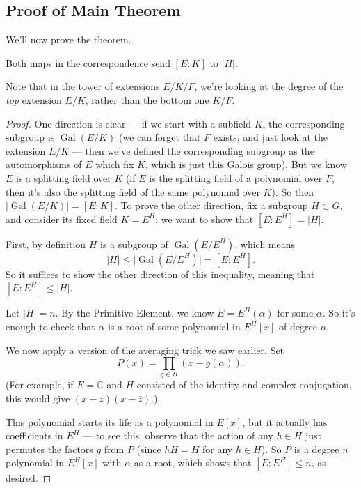 \subsection{Proof of Main Theorem}

We'll now prove the theorem. 

\begin{lemma}
Both maps in the correspondence send $[E : K]$ to $\lvert H \rvert$. 
\end{lemma}

Note that in the tower of extensions $E/K/F$, we're looking at the degree of the \emph{top} extension $E/K$, rather than the bottom one $K/F$.

\begin{proof}
One direction is clear --- if we start with a subfield $K$, the corresponding subgroup is $\operatorname{Gal}(E/K)$ (we can forget that $F$ exists, and just look at the extension $E/K$ --- then we've defined the corresponding subgroup as the automorphisms of $E$ which fix $K$, which is just this Galois group). But we know $E$ is a splitting field over $K$ (if $E$ is the splitting field of a polynomial over $F$, then it's also the splitting field of the same polynomial over $K$). So then $\lvert \operatorname{Gal}(E/K)\rvert = [E : K]$. 
To prove the other direction, fix a subgroup $H \subset G$, and consider its fixed field $K = E^H$; we want to show that $[E : E^H] = \lvert H \rvert$. 

First, by definition $H$ is a subgroup of $\operatorname{Gal}(E/E^H)$, which means \[\lvert H \rvert \leq \lvert \operatorname{Gal}(E/E^H)\rvert = [E : E^H].\] So it suffices to show the other direction of this inequality, meaning that $[E : E^H] \leq \lvert H \rvert$. 

Let $\lvert H \rvert = n$. By the Primitive Element, we know $E = E^H(\alpha)$ for some $\alpha$. So it's enough to check that $\alpha$ is a root of some polynomial in $E^H[x]$ of degree $n$. 

We now apply a version of the averaging trick we saw earlier. Set \[P(x) = \prod_{g \in H} (x - g(\alpha)).\] (For example, if $E = \mathbb{C}$ and $H$ consisted of the identity and complex conjugation, this would give $(x - z)(x - \overline{z})$.) 

This polynomial starts its life as a polynomial in $E[x]$, but it actually has coefficients in $E^H$ --- to see this, observe that the action of any $h \in H$ just permutes the factors $g$ from $P$ (since $hH = H$ for any $h \in H$). So $P$ is a degree $n$ polynomial in $E^H[x]$ with $\alpha$ as a root, which shows that $[E : E^H] \leq n$, as desired. 
\end{proof}

